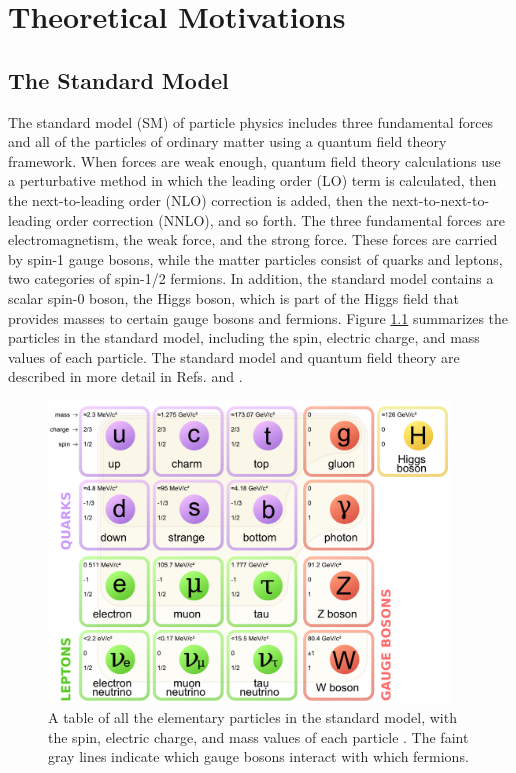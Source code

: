 \chapter{Theoretical Motivations
\label{ch:theory}}

\setcounter{section}{-1}

\section{The Standard Model}

The standard model (SM) of particle physics includes three fundamental forces and all of the particles of ordinary matter using a quantum field theory framework. When forces are weak enough, quantum field theory calculations use a perturbative method in which the leading order (LO) term is calculated, then the next-to-leading order (NLO) correction is added, then the next-to-next-to-leading order correction (NNLO), and so forth. The three fundamental forces are electromagnetism, the weak force, and the strong force. These forces are carried by spin-1 gauge bosons, while the matter particles consist of quarks and leptons, two categories of spin-1/2 fermions. In addition, the standard model contains a scalar spin-0 boson, the Higgs boson, which is part of the Higgs field that provides masses to certain gauge bosons and fermions. Figure \ref{fig:sm-particles} summarizes the particles in the standard model, including the spin, electric charge, and mass values of each particle. The standard model and quantum field theory are described in more detail in Refs. \cite{Griffiths} and \cite{Peskin}.

\begin{figure}[hbt]
\begin{center}
\includegraphics[width=0.95\textwidth]{figures/Standard_Model_of_Elementary_Particles.pdf}
\caption{A table of all the elementary particles in the standard model, with the spin, electric charge, and mass values of each particle \cite{MissMJ}. The faint gray lines indicate which gauge bosons interact with which fermions.}
\label{fig:sm-particles}
\end{center}
\end{figure}

